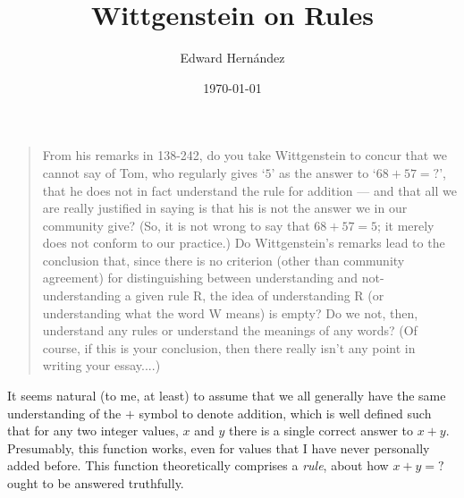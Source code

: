 \documentclass[doc,12pt,apacite,biblatex]{apa6}
\begin{document}
 \title{Wittgenstein on Rules}
\author{Edward Hern\'{a}ndez}
\date{\today}

\maketitle

\begin{quote}
	From his remarks in 138-242, do you take Wittgenstein to concur that we
	cannot say of Tom, who regularly gives `$5$' as the answer to `$68 + 57 =
	?$', that he does not in fact understand the rule for addition --- and that
	all we are really justified in saying is that his is not the answer we in
	our community give?  (So, it is not wrong to say that $68 + 57 = 5$; it
	merely does not conform to our practice.)  Do Wittgenstein's remarks lead
	to the conclusion that, since there is no criterion (other than community
	agreement) for distinguishing between understanding and not-understanding a
	given rule R, the idea of understanding R (or understanding what the word W
	means) is empty?  Do we not, then, understand any rules or understand the
	meanings of any words?  (Of course, if this is your conclusion, then there
	really isn't any point in writing your essay....)
\end{quote}

It seems natural (to me, at least) to assume that we all generally have the same understanding of the $+$ symbol to denote addition, which is well defined such that for any two integer values, $x$ and $y$ there is a single correct answer to $x + y$. Presumably, this function works, even for values that I have never personally added before. This function theoretically comprises a \emph{rule}, about how $x + y = ?$ ought to be answered truthfully.
\end{document}
